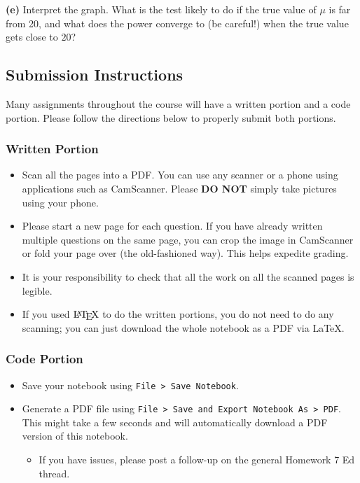 \documentclass[11pt]{article}
\providecommand{\tightlist}{%
      \setlength{\itemsep}{0pt}\setlength{\parskip}{0pt}}
\let\Oldlatex\LaTeX
\renewcommand{\LaTeX}{\textrm{\Oldlatex}}
\begin{document}
    \textbf{(e)} Interpret the graph. What is the test likely to do if the
true value of \(\mu\) is far from 20, and what does the power converge
to (be careful!) when the true value gets close to \(20\)?

    \subsection{Submission Instructions}\label{submission-instructions}

Many assignments throughout the course will have a written portion and a
code portion. Please follow the directions below to properly submit both
portions.

\subsubsection{Written Portion}\label{written-portion}

\begin{itemize}
\tightlist
\item
  Scan all the pages into a PDF. You can use any scanner or a phone
  using applications such as CamScanner. Please \textbf{DO NOT} simply
  take pictures using your phone.
\item
  Please start a new page for each question. If you have already written
  multiple questions on the same page, you can crop the image in
  CamScanner or fold your page over (the old-fashioned way). This helps
  expedite grading.
\item
  It is your responsibility to check that all the work on all the
  scanned pages is legible.
\item
  If you used \(\LaTeX\) to do the written portions, you do not need to
  do any scanning; you can just download the whole notebook as a PDF via
  LaTeX.
\end{itemize}

\subsubsection{Code Portion}\label{code-portion}

\begin{itemize}
\tightlist
\item
  Save your notebook using
  \texttt{File\ \textgreater{}\ Save\ Notebook}.
\item
  Generate a PDF file using
  \texttt{File\ \textgreater{}\ Save\ and\ Export\ Notebook\ As\ \textgreater{}\ PDF}.
  This might take a few seconds and will automatically download a PDF
  version of this notebook.

  \begin{itemize}
  \tightlist
  \item
    If you have issues, please post a follow-up on the general Homework
    7 Ed thread.
  \end{itemize}
\end{itemize}
\end{document}
